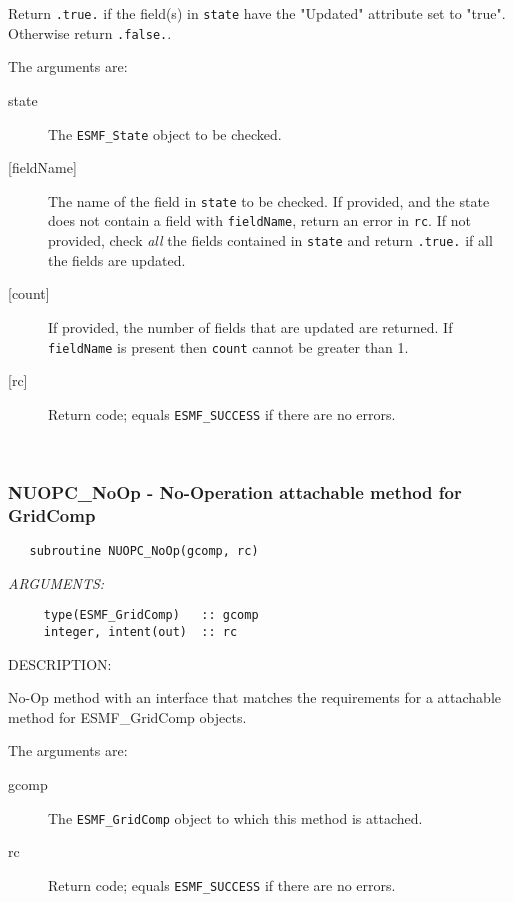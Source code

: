      Return {\tt .true.} if the field(s) in {\tt state} have the "Updated"
     attribute set to "true". Otherwise return {\tt .false.}. 
  
     The arguments are:
     \begin{description}
     \item[state]
       The {\tt ESMF\_State} object to be checked.
     \item[{[fieldName]}]
       The name of the field in {\tt state} to be checked. If provided, and 
       the state does not contain a field with {\tt fieldName}, return an 
       error in {\tt rc}. If not provided, check {\em all} the fields contained
       in {\tt state} and return {\tt .true.} if all the fields are updated.
     \item[{[count]}]
       If provided, the number of fields that are updated are returned. If 
       {\tt fieldName} is present then {\tt count} cannot be greater than 1.
     \item[{[rc]}]
       Return code; equals {\tt ESMF\_SUCCESS} if there are no errors.
     \end{description}
   
 
\mbox{}\hrulefill\ 
 
\subsubsection [NUOPC\_NoOp] {NUOPC\_NoOp - No-Operation attachable method for GridComp}


\begin{verbatim}   subroutine NUOPC_NoOp(gcomp, rc)\end{verbatim}{\em ARGUMENTS:}
\begin{verbatim}     type(ESMF_GridComp)   :: gcomp
     integer, intent(out)  :: rc\end{verbatim}
{\sf DESCRIPTION:\\ }


     No-Op method with an interface that matches the
     requirements for a attachable method for ESMF\_GridComp objects.
  
     The arguments are:
     \begin{description}
     \item[gcomp]
       The {\tt ESMF\_GridComp} object to which this method is attached.
     \item[rc]
       Return code; equals {\tt ESMF\_SUCCESS} if there are no errors.
     \end{description}
   
